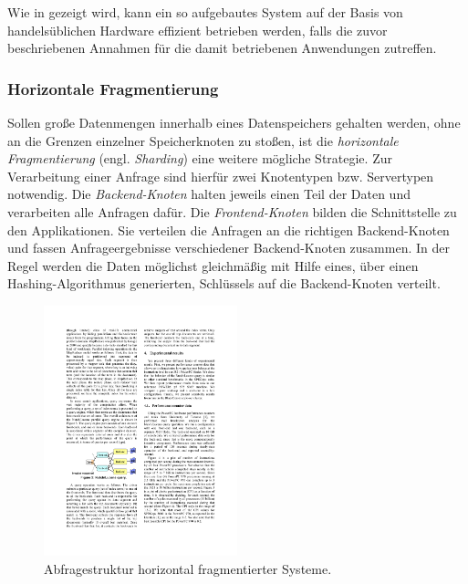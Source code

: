 Wie in  \citep{ghemawat03}  gezeigt wird, kann ein so aufgebautes System auf der Basis von handelsüblichen Hardware effizient betrieben werden, falls die zuvor beschriebenen Annahmen für die damit betriebenen Anwendungen zutreffen.  \citep{ghemawat03}

\subsubsection{Horizontale Fragmentierung}\label{sec:sharding}

Sollen große Datenmengen innerhalb eines Datenspeichers gehalten werden, ohne an die Grenzen einzelner Speicherknoten zu stoßen, ist die \textit{horizontale Fragmentierung} (engl. \textit{Sharding}) eine weitere mögliche Strategie. Zur Verarbeitung einer Anfrage sind hierfür zwei Knotentypen bzw. Servertypen notwendig. Die \textit{Backend-Knoten} halten jeweils einen Teil der Daten und verarbeiten alle Anfragen dafür. Die \textit{Frontend-Knoten} bilden die Schnittstelle zu den Applikationen. Sie verteilen die Anfragen an die richtigen Backend-Knoten und fassen Anfrageergebnisse verschiedener Backend-Knoten zusammen. In der Regel werden die Daten möglichst gleichmäßig mit Hilfe eines, über einen Hashing-Algorithmus generierten, Schlüssels auf die Backend-Knoten verteilt. \citep{Michael07}
\begin{figure}[H]
  \centering
    \includegraphics[width=0.5\textwidth]{Abbildungen/sharding}
    \caption[Horizonale Fragmentierung]{\footnotesize Abfragestruktur horizontal fragmentierter Systeme. \citep{Michael07} }
    \label{fig:sharding}
\end{figure}

